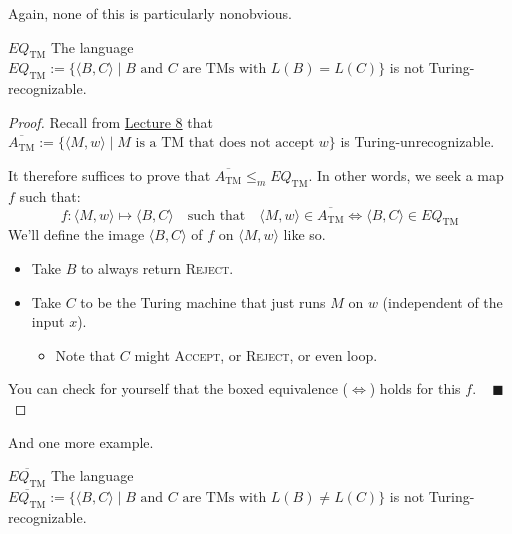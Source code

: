 Again, none of this is particularly nonobvious.

\begin{theorem}{$EQ_{\mathrm{TM}}$}
    The language $EQ_{\mathrm{TM}} := \{\langle B, C \rangle \mid
    B \text{ and } C \text{ are TMs with } L(B) = L(C)\}$
    is not Turing-recognizable.
\end{theorem}

\begin{proof}
    Recall from \href{/18.404/lectures/8/#turing-unrecognizable-a-tm}{Lecture 8}
    that $\overline{A_{\mathrm{TM}}} := \{\langle M, w \rangle \mid
    M \text{ is a TM that does not accept } w\}$ is Turing-unrecognizable.

    It therefore suffices to prove that
    $\overline{A_{\mathrm{TM}}} \leq_m EQ_{\mathrm{TM}}$.
    In other words, we seek a map $f$ such that:
    \[
    f \colon \langle M, w \rangle \mapsto \langle B, C \rangle
    ~~~ \text{ such that } ~~~
    \boxed{\langle M, w \rangle \in \overline{A_{\mathrm{TM}}}
    \iff \langle B, C \rangle \in EQ_{\mathrm{TM}}}
    \]
    We'll define the image $\langle B, C \rangle$
    of $f$ on $\langle M, w \rangle$ like so.
    \begin{itemize}
        \item Take $B$ to always return \textsc{Reject}.
        \item Take $C$ to be the Turing machine that
        just runs $M$ on $w$ (independent of the input $x$).
        \begin{itemize}
            \item Note that $C$ might \textsc{Accept},
            or \textsc{Reject}, or even loop.
        \end{itemize}
    \end{itemize}
    You can check for yourself that
    the boxed equivalence ($\iff$) holds for this $f$.
    ~ $\blacksquare$
\end{proof}

And one more example.

\begin{theorem}{$\overline{EQ_{\mathrm{TM}}}$}
    The language $\overline{EQ_{\mathrm{TM}}} := \{\langle B, C \rangle \mid
    B \text{ and } C \text{ are TMs with } L(B) \neq L(C)\}$
    is not Turing-recognizable.
\end{theorem}

